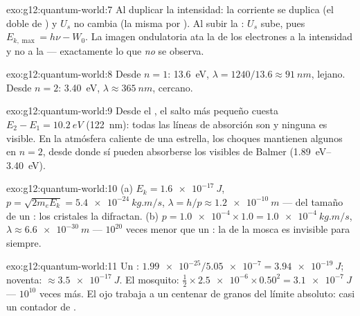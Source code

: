 \begin{solution}{exo:g12:quantum-world:7}
Al duplicar la intensidad: la corriente se duplica (el doble de
) y $U_s$ no cambia (la misma  por ). Al subir la
: $U_s$ sube, pues $E_{k,\max} = h\nu - W_0$. La imagen
ondulatoria ata la  de los electrones a la intensidad y no a la
 --- exactamente lo que \emph{no} se observa.
\end{solution}

\begin{solution}{exo:g12:quantum-world:8}
Desde $n = 1$: \qty{13.6}{eV}, $\lambda = 1240/13.6 \approx
\qty{91}{nm}$,  lejano. Desde $n = 2$: \qty{3.40}{eV},
$\lambda \approx \qty{365}{nm}$,  cercano.
\end{solution}

\begin{solution}{exo:g12:quantum-world:9}
Desde el , el salto más pequeño cuesta
$E_2 - E_1 = \qty{10.2}{eV}$ (\qty{122}{nm}): todas las líneas de
absorción son  y ninguna es visible. En la atmósfera
caliente de una estrella, los choques mantienen algunos  en
$n = 2$, desde donde sí pueden absorberse los  visibles de Balmer
(\qtyrange{1.89}{3.40}{eV}).
\end{solution}

\begin{solution}{exo:g12:quantum-world:10}
(a) $E_k = \qty{1.6e-17}{J}$,
$p = \sqrt{2m_e E_k} = \qty{5.4e-24}{kg.m/s}$,
$\lambda = h/p \approx \qty{1.2e-10}{m}$ --- del tamaño de un : los
cristales la difractan. (b) $p = \num{1.0e-4} \times 1.0 =
\qty{1.0e-4}{kg.m/s}$, $\lambda \approx \qty{6.6e-30}{m}$ --- $10^{20}$
veces menor que un : la  de la mosca es invisible para siempre.
\end{solution}

\begin{solution}{exo:g12:quantum-world:11}
Un : $\num{1.99e-25}/\num{5.05e-7} = \qty{3.94e-19}{J}$; noventa:
$\approx \qty{3.5e-17}{J}$. El mosquito:
$\tfrac12 \times \num{2.5e-6} \times 0.50^2 = \qty{3.1e-7}{J}$ ---
$10^{10}$ veces más. El ojo trabaja a un centenar de granos del límite
absoluto: casi un contador de .
\end{solution}

